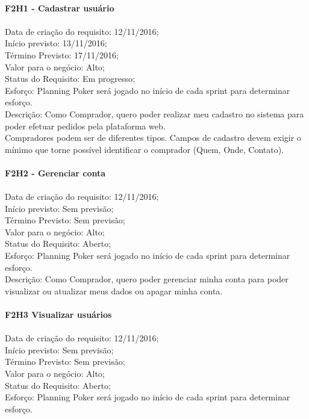 \begin{apendicesenv}
\\
\textbf{F2H1 - Cadastrar usuário}\\ \\
\tab Data de criação do requisito: 12/11/2016;\\
\tab Início previsto: 13/11/2016;\\
\tab Término Previsto: 17/11/2016;\\
\tab Valor para o negócio: Alto;\\
\tab Status do Requisito: Em progresso;\\
\tab Esforço: Planning Poker será jogado no início de cada sprint para determinar esforço.\\
\tab Descrição: Como Comprador, quero poder realizar meu cadastro no sistema para poder efetuar pedidos pela plataforma web.\\
\tab Compradores podem ser de diferentes tipos. Campos de cadastro devem exigir o mínimo que torne possível identificar o comprador (Quem, Onde, Contato).\\
\\
\textbf{F2H2 - Gerenciar conta}\\ \\
\tab Data de criação do requisito: 12/11/2016;\\
\tab Início previsto: Sem previsão;\\
\tab Término Previsto: Sem previsão;\\
\tab Valor para o negócio: Alto;\\
\tab Status do Requisito: Aberto;\\
\tab Esforço: Planning Poker será jogado no início de cada sprint para determinar esforço.\\
\tab Descrição: Como Comprador, quero poder gerenciar minha conta para poder visualizar ou atualizar meus dados ou apagar minha conta.\\
\\
\textbf{F2H3 Visualizar usuários}\\ \\
\tab Data de criação do requisito: 12/11/2016;\\
\tab Início previsto: Sem previsão;\\
\tab Término Previsto: Sem previsão;\\
\tab Valor para o negócio: Alto;\\
\tab Status do Requisito: Aberto;\\
\tab Esforço: Planning Poker será jogado no início de cada sprint para determinar esforço.\\

\end{apendicesenv}
